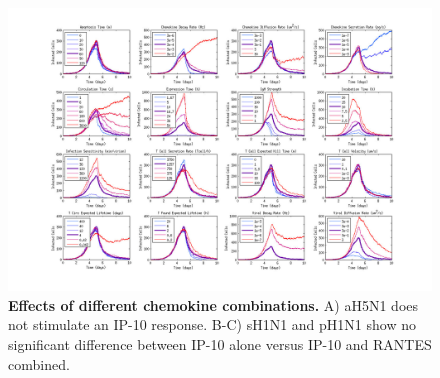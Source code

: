 \documentclass[preprint,10pt,authoryear]{article}
\begin{document}
\begin{figure}[ht!]
\begin{center}
	\includegraphics[width=\textwidth]{Figure_S3}
	\caption{\textbf{Effects of different chemokine combinations.}  A) aH5N1 does not stimulate an IP-10 response.  B-C) sH1N1 and pH1N1 show no significant difference between IP-10 alone versus IP-10 and RANTES combined.}
	\label{fig:chemokine}
\end{center}
\end{figure}
\end{document}
